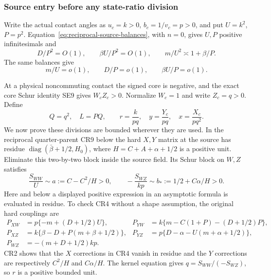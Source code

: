 \subsubsection*{Source entry before any state-ratio division}

Write the actual contact angles as $u_c=k>0$, $b_c=1/v_c=p>0$,
and put $U=k^2$, $P=p^2$. Equation~\eqref{eq:reciprocal-source-balances}, with $n=0$,
gives $U,P$ positive infinitesimals and
\[
 D/P^2=O(1),\qquad \beta U/P^2=O(1),\qquad
 m/U^2\asymp1+\beta/P.
 \tag{CR1}
\]
The same balances give
\[
 m/U=o(1),\qquad D/P=o(1),\qquad \beta U/P=o(1).
 \tag{CR2}
\]

At a physical noncommuting contact the signed core is negative, and
the exact core Schur identity SE9 gives $W_cZ_c>0$. Normalize $W_c=1$
and write $Z_c=q>0$. Define
\[
 Q=q^2,\quad L=PQ,\qquad
 r=\frac{k}{pq},\quad y=\frac{Y_c}{pq},\quad
 x=\frac{X_c}{pq^2}.
 \tag{CR3}
\]
We now prove these divisions are bounded wherever they are used.
In the reciprocal quarter-parent CR9 below the hard $X,Y$ matrix at
the source has residue
$\operatorname{diag}(\bar\beta+1/2,H_0)$, where
$H=C+A+\alpha+1/2$ is a positive unit. Eliminate this two-by-two
block inside the source field. Its Schur block on $W,Z$ satisfies
\[
 \frac{S_{WW}}{U}\sim a:=C-C^2/H>0,\qquad
 -\frac{S_{WZ}}{kp}\sim b_*:=1/2+C\alpha/H>0.
 \tag{CR4}
\]
Here and below a displayed positive expression in an asymptotic
formula is evaluated in residue. To check CR4 without a shape
assumption, the original hard couplings are
\[
\begin{aligned}
 P_{XW}&=p\{-m+(D+1/2)U\},&
 P_{YW}&=k\{m-C(1+P)-(D+1/2)P\},\\
 P_{XZ}&=k\{\beta-D+P(m+\beta+1/2)\},&
 P_{YZ}&=p\{D-\alpha-U(m+\alpha+1/2)\},\\
 P_{WZ}&=-(m+D+1/2)kp.
\end{aligned}
\]
CR2 shows that the $X$ corrections in CR4 vanish in residue and
the $Y$ corrections are respectively $C^2/H$ and $C\alpha/H$.
The kernel equation gives $q=S_{WW}/(-S_{WZ})$, so $r$ is a
positive bounded unit.

